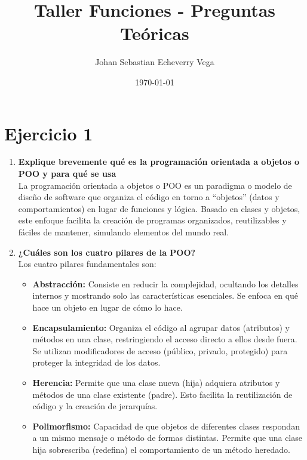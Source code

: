 \documentclass[12pt, a4paper]{article}
\title{Taller Funciones - Preguntas Teóricas}
\author{Johan Sebastian Echeverry Vega}
\date{\today}
\begin{document}
\maketitle

\section*{Ejercicio 1}

\begin{enumerate}
    
    \item \textbf{Explique brevemente qué es la programación orientada a objetos o POO y para qué se usa} \\
    La programación orientada a objetos o POO es un paradigma o modelo de diseño de software que organiza el código en torno a ``objetos'' (datos y comportamientos) en lugar de funciones y lógica. Basado en clases y objetos, este enfoque facilita la creación de programas organizados, reutilizables y fáciles de mantener, simulando elementos del mundo real.

    \item \textbf{¿Cuáles son los cuatro pilares de la POO?} \\
    Los cuatro pilares fundamentales son:
    \begin{itemize}
        \item \textbf{Abstracción:} Consiste en reducir la complejidad, ocultando los detalles internos y mostrando solo las características esenciales. Se enfoca en qué hace un objeto en lugar de cómo lo hace.
        \item \textbf{Encapsulamiento:} Organiza el código al agrupar datos (atributos) y métodos en una clase, restringiendo el acceso directo a ellos desde fuera. Se utilizan modificadores de acceso (público, privado, protegido) para proteger la integridad de los datos.
        \item \textbf{Herencia:} Permite que una clase nueva (hija) adquiera atributos y métodos de una clase existente (padre). Esto facilita la reutilización de código y la creación de jerarquías.
        \item \textbf{Polimorfismo:} Capacidad de que objetos de diferentes clases respondan a un mismo mensaje o método de formas distintas. Permite que una clase hija sobrescriba (redefina) el comportamiento de un método heredado.
    \end{itemize}


\end{enumerate}
\end{document}
